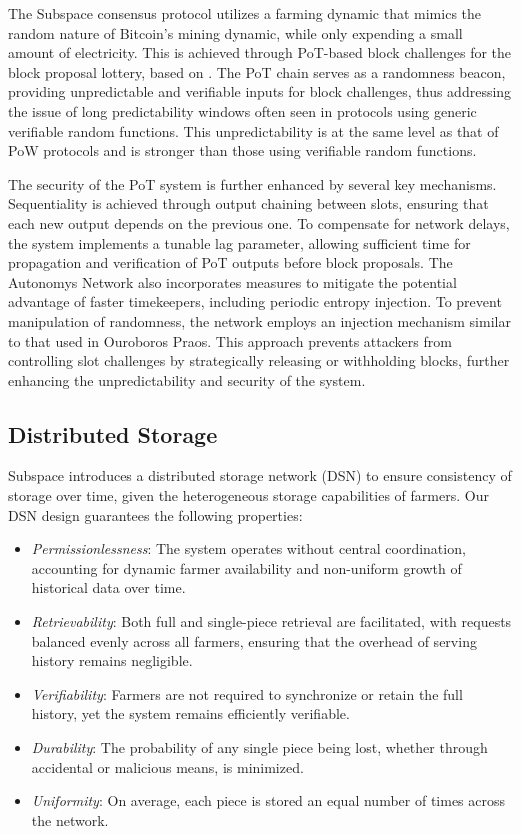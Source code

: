 \documentclass[conference]{IEEEtran}
\begin{document}
The Subspace consensus protocol utilizes a farming dynamic that mimics the random nature of Bitcoin's mining dynamic, while only expending a small amount of electricity. This is achieved through PoT-based block challenges for the block proposal lottery, based on \cite{posat}. The PoT chain serves as a randomness beacon, providing unpredictable and verifiable inputs for block challenges, thus addressing the issue of long predictability windows often seen in protocols using generic verifiable random functions. This unpredictability is at the same level as that of PoW protocols and is stronger than those using verifiable random functions.

The security of the PoT system is further enhanced by several key mechanisms. Sequentiality is achieved through output chaining between slots, ensuring that each new output depends on the previous one. To compensate for network delays, the system implements a tunable lag parameter, allowing sufficient time for propagation and verification of PoT outputs before block proposals. The Autonomys Network also incorporates measures to mitigate the potential advantage of faster timekeepers, including periodic entropy injection. To prevent manipulation of randomness, the network employs an injection mechanism similar to that used in Ouroboros Praos\cite{ouroborospraos}. This approach prevents attackers from controlling slot challenges by strategically releasing or withholding blocks, further enhancing the unpredictability and security of the system.

\subsection{Distributed Storage}
\label{sec:dsn}
Subspace introduces a distributed storage network (DSN) to ensure consistency of storage over time, given the heterogeneous storage capabilities of farmers. Our DSN design guarantees the following properties:

\begin{itemize}
    \item \textit{Permissionlessness}: The system operates without central coordination, accounting for dynamic farmer availability and non-uniform growth of historical data over time.
    \item \textit{Retrievability}: Both full and single-piece retrieval are facilitated, with requests balanced evenly across all farmers, ensuring that the overhead of serving history remains negligible.
    \item \textit{Verifiability}: Farmers are not required to synchronize or retain the full history, yet the system remains efficiently verifiable.
    \item \textit{Durability}: The probability of any single piece being lost, whether through accidental or malicious means, is minimized.
    \item \textit{Uniformity}: On average, each piece is stored an equal number of times across the network.
\end{itemize}
\end{document}
